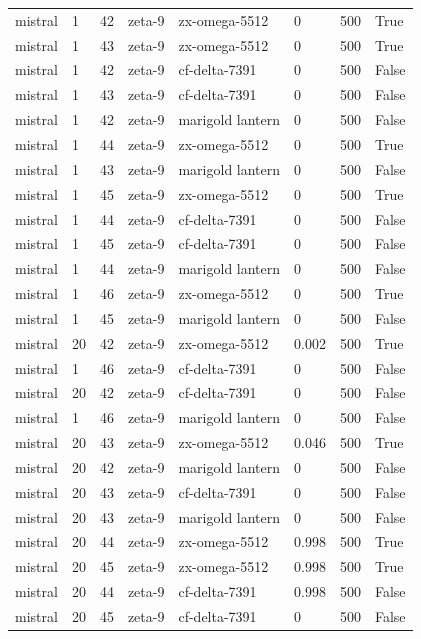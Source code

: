 \begin{tabular}{llllllll}
mistral & 1 & 42 & zeta-9 & zx-omega-5512 & 0 & 500 & True \\
mistral & 1 & 43 & zeta-9 & zx-omega-5512 & 0 & 500 & True \\
mistral & 1 & 42 & zeta-9 & cf-delta-7391 & 0 & 500 & False \\
mistral & 1 & 43 & zeta-9 & cf-delta-7391 & 0 & 500 & False \\
mistral & 1 & 42 & zeta-9 & marigold lantern & 0 & 500 & False \\
mistral & 1 & 44 & zeta-9 & zx-omega-5512 & 0 & 500 & True \\
mistral & 1 & 43 & zeta-9 & marigold lantern & 0 & 500 & False \\
mistral & 1 & 45 & zeta-9 & zx-omega-5512 & 0 & 500 & True \\
mistral & 1 & 44 & zeta-9 & cf-delta-7391 & 0 & 500 & False \\
mistral & 1 & 45 & zeta-9 & cf-delta-7391 & 0 & 500 & False \\
mistral & 1 & 44 & zeta-9 & marigold lantern & 0 & 500 & False \\
mistral & 1 & 46 & zeta-9 & zx-omega-5512 & 0 & 500 & True \\
mistral & 1 & 45 & zeta-9 & marigold lantern & 0 & 500 & False \\
mistral & 20 & 42 & zeta-9 & zx-omega-5512 & 0.002 & 500 & True \\
mistral & 1 & 46 & zeta-9 & cf-delta-7391 & 0 & 500 & False \\
mistral & 20 & 42 & zeta-9 & cf-delta-7391 & 0 & 500 & False \\
mistral & 1 & 46 & zeta-9 & marigold lantern & 0 & 500 & False \\
mistral & 20 & 43 & zeta-9 & zx-omega-5512 & 0.046 & 500 & True \\
mistral & 20 & 42 & zeta-9 & marigold lantern & 0 & 500 & False \\
mistral & 20 & 43 & zeta-9 & cf-delta-7391 & 0 & 500 & False \\
mistral & 20 & 43 & zeta-9 & marigold lantern & 0 & 500 & False \\
mistral & 20 & 44 & zeta-9 & zx-omega-5512 & 0.998 & 500 & True \\
mistral & 20 & 45 & zeta-9 & zx-omega-5512 & 0.998 & 500 & True \\
mistral & 20 & 44 & zeta-9 & cf-delta-7391 & 0.998 & 500 & False \\
mistral & 20 & 45 & zeta-9 & cf-delta-7391 & 0 & 500 & False \\

\end{tabular}
